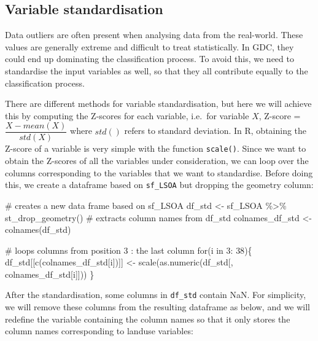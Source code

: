 \documentclass[
  letterpaper,
  DIV=11,
  numbers=noendperiod]{scrreprt}
\newenvironment{Shaded}{\begin{snugshade}}{\end{snugshade}}
\newcommand{\CommentTok}[1]{\textcolor[rgb]{0.37,0.37,0.37}{#1}}
\newcommand{\ControlFlowTok}[1]{\textcolor[rgb]{0.00,0.23,0.31}{#1}}
\newcommand{\DecValTok}[1]{\textcolor[rgb]{0.68,0.00,0.00}{#1}}
\newcommand{\FunctionTok}[1]{\textcolor[rgb]{0.28,0.35,0.67}{#1}}
\newcommand{\NormalTok}[1]{\textcolor[rgb]{0.00,0.23,0.31}{#1}}
\newcommand{\OtherTok}[1]{\textcolor[rgb]{0.00,0.23,0.31}{#1}}
\newcommand{\SpecialCharTok}[1]{\textcolor[rgb]{0.37,0.37,0.37}{#1}}
\begin{document}
\hypertarget{variable-standardisation}{%
\subsection{Variable standardisation}\label{variable-standardisation}}

Data outliers are often present when analysing data from the real-world.
These values are generally extreme and difficult to treat statistically.
In GDC, they could end up dominating the classification process. To
avoid this, we need to standardise the input variables as well, so that
they all contribute equally to the classification process.

There are different methods for variable standardisation, but here we
will achieve this by computing the Z-scores for each variable, i.e.~for
variable \(X\), Z-score = \(\dfrac{X-mean(X)}{std(X)}\) where \(std()\)
refers to standard deviation. In R, obtaining the Z-score of a variable
is very simple with the function \texttt{scale()}. Since we want to
obtain the Z-scores of all the variables under consideration, we can
loop over the columns corresponding to the variables that we want to
standardise. Before doing this, we create a dataframe based on
\texttt{sf\_LSOA} but dropping the geometry column:

\begin{Shaded}
\begin{Highlighting}[]
\CommentTok{\# creates a new data frame based on sf\_LSOA}
\NormalTok{df\_std }\OtherTok{\textless{}{-}}\NormalTok{ sf\_LSOA }\SpecialCharTok{\%\textgreater{}\%} \FunctionTok{st\_drop\_geometry}\NormalTok{()}
\CommentTok{\# extracts column names from df\_std}
\NormalTok{colnames\_df\_std }\OtherTok{\textless{}{-}} \FunctionTok{colnames}\NormalTok{(df\_std)}

\CommentTok{\# loops columns from position 3 : the last column}
\ControlFlowTok{for}\NormalTok{(i }\ControlFlowTok{in} \DecValTok{3}\SpecialCharTok{:} \DecValTok{38}\NormalTok{)\{}
\NormalTok{df\_std[[}\FunctionTok{c}\NormalTok{(colnames\_df\_std[i])]] }\OtherTok{\textless{}{-}} \FunctionTok{scale}\NormalTok{(}\FunctionTok{as.numeric}\NormalTok{(df\_std[, colnames\_df\_std[i]]))}
\NormalTok{\}}
\end{Highlighting}
\end{Shaded}

After the standardisation, some columns in \texttt{df\_std} contain NaN.
For simplicity, we will remove these columns from the resulting
dataframe as below, and we will redefine the variable containing the
column names so that it only stores the column names corresponding to
landuse variables:
\end{document}
